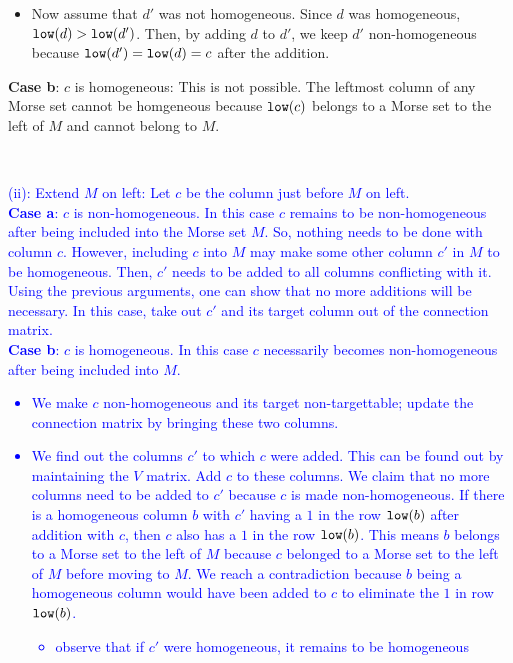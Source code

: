 \documentclass[a4paper,english,cleveref]{article}
\theoremstyle{plain}
\newcounter{li}
\newcommand{\tamal}[1]{\textcolor{blue}{#1}}
\newcommand{\low}{{\tt low}}
\begin{document}
{{\begin{itemize}
\begin{itemize}
Thus, $d'$ does not have to added to any more columns to its right because of being changed by addition of $d$ to it.
\item Now assume that $d'$ was not homogeneous. Since $d$ was homogeneous, $\low(d)>\low(d')$. Then,
by adding $d$ to $d'$, we keep $d'$ non-homogeneous because $\low(d')=\low(d)=c$ after the addition.
\end{itemize}
\end{itemize}
{\bf Case b}: $c$ is homogeneous: This is not possible. The leftmost column of any
Morse set cannot be homgeneous because $\low(c)$ belongs to a Morse set to the left of $M$ and cannot belong to $M$.}\\

\tamal{(ii): Extend $M$ on left: Let $c$ be the column just before $M$ on left.\\
{\bf Case a}: $c$ is non-homogeneous. In this case $c$ remains to be non-homogeneous
after being included into the Morse set $M$. So, nothing needs to be done with column $c$. However, including $c$ into $M$ may make some other column $c'$ in $M$ to be homogeneous. Then, $c'$ needs to be added to all columns conflicting with it. Using the previous arguments, one can show that no more additions will be necessary. In this case, take out $c'$ and its target column out of the connection matrix.\\
{\bf Case b}: $c$ is homogeneous. In this case $c$ necessarily becomes
non-homogeneous after being included into $M$.
\begin{itemize}
    \item  We make $c$ non-homogeneous and its target non-targettable; update the connection matrix by bringing these two columns. 
    \item We find out the columns $c'$ to which $c$ were added. This can be found out by maintaining the $V$ matrix. Add $c$ to these columns. We claim that no more columns need to be added to $c'$ because $c$ is made non-homogeneous. If there is a homogeneous column $b$ with $c'$ having a $1$ in the row $\low(b)$ after addition with $c$, then $c$ also has a $1$ in the row $\low(b)$. This means $b$ belongs to a Morse set to the left of $M$ because $c$ belonged to a Morse set to the left of $M$ before moving to $M$. We reach a contradiction because $b$ being a homogeneous column would have been added to $c$ to eliminate the $1$ in row $\low(b)$. 
\begin{itemize}
\item observe that if $c'$ were homogeneous, it remains to be homogeneous 

\end{itemize}
\end{itemize}}}
\end{document}
